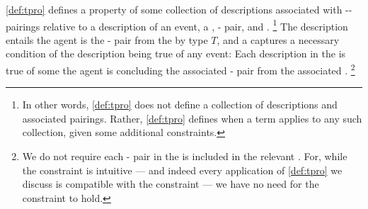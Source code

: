 \begin{note}
  \noindent%
  \autoref{def:tpro} defines a property of some collection of descriptions associated with -- pairings relative to a description of an event, a \torNa{}, - pair, and \pool{}.%
  \footnote{
    In other words, \autoref{def:tpro} does not define a collection of descriptions and associated pairings.
    Rather, \autoref{def:tpro} defines when a term applies to any such collection, given some additional constraints.
  }
  The description entails the agent is \tCV{} the - pair from the \pool{} by type \(T\), and a \tpro{} captures a necessary condition of the description being true of any event:
  Each description in the \tpro{} is true of some \eiw{} the agent is concluding the associated - pair from the associated \pool{}.%
  \footnote{
    We do not require each - pair in the \tpro{} is included in the relevant \torNa{}.
    For, while the constraint is intuitive --- and indeed every application of \autoref{def:tpro} we discuss is compatible with the constraint --- we have no need for the constraint to hold.
  }
\end{note}

